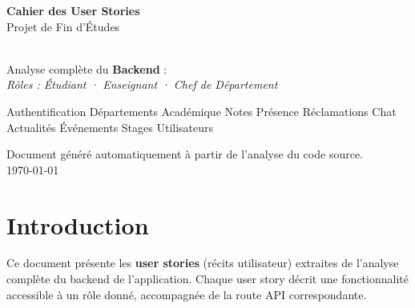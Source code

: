 \documentclass[12pt,a4paper]{article}
\begin{document}
\hypersetup{pageanchor=false}

\begin{titlepage}
  \centering
  \vspace*{3cm}

  {\Huge\bfseries\color{headerBg} Cahier des User Stories}\\[0.6cm]
  {\Large\color{routeGray} Projet de Fin d'Études}\\[1.5cm]

  \\[1.5cm]

  {\large\color{darkText}
    Analyse complète du \textbf{Backend} :\\[0.3cm]
    \textit{Rôles : Étudiant · Enseignant · Chef de Département}
  }\\[2cm]

  \begin{infobox}
    \centering
    \small
    Authentification \textbullet\;
    Départements \textbullet\;
    Académique \textbullet\;
    Notes \textbullet\;
    Présence \textbullet\;
    Réclamations \textbullet\;
    Chat \textbullet\;
    Actualités \textbullet\;
    Événements \textbullet\;
    Stages \textbullet\;
    Utilisateurs
  \end{infobox}

  \vfill
  {\small\color{routeGray} Document généré automatiquement à partir de l'analyse du code source.}\\[0.5cm]
  {\small\color{routeGray} \today}
\end{titlepage}
\hypersetup{pageanchor=true}

\tableofcontents
\newpage

\section{Introduction}

Ce document présente les \textbf{user stories} (récits utilisateur) extraites de l'analyse complète du backend de l'application. Chaque user story décrit une fonctionnalité accessible à un rôle donné, accompagnée de la route API correspondante.
\end{document}
